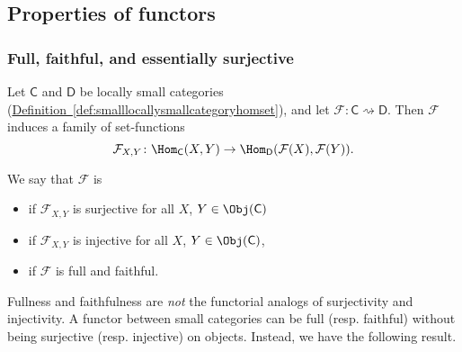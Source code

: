 \documentclass[notes.tex]{subfiles}
\begin{document}
\subsection{Properties of functors}

\subsubsection{Full, faithful, and essentially surjective}

\begin{definition}
  \label{def:fullfaithfulfunctor}
  Let $\mathsf{C}$ and $\mathsf{D}$ be locally small categories (\hyperref[def:smalllocallysmallcategoryhomset]{Definition~\ref*{def:smalllocallysmallcategoryhomset}}), and let $\mathcal{F}: \mathsf{C} \rightsquigarrow \mathsf{D}$. Then $\mathcal{F}$ induces a family of set-functions
  \begin{equation*}
    \mathcal{F}_{X, Y}\colon \Hom_{\mathsf{C}}(X, Y) \to \Hom_{\mathsf{D}}(\mathcal{F}(X), \mathcal{F}(Y)).
  \end{equation*}

  We say that $\mathcal{F}$ is
  \begin{itemize}
    \item {} if $\mathcal{F}_{X, Y}$ is surjective for all $X$, $Y \in \Obj(\mathsf{C})$
    \item {} if $\mathcal{F}_{X, Y}$ is injective for all $X$, $Y \in \Obj(\mathsf{C})$,
    \item {} if $\mathcal{F}$ is full and faithful.
  \end{itemize}
\end{definition}

\begin{note}
  Fullness and faithfulness are \emph{not} the functorial analogs of surjectivity and injectivity. A functor between small categories can be full (resp. faithful) without being surjective (resp. injective) on objects. Instead, we have the following result.
\end{note}
\end{document}
